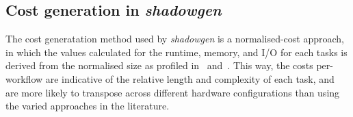 \documentclass{article}
\begin{document}
\begin{multicols}{2}
\subsection*{Cost generation in \textit{shadowgen}} 
The cost generatation method used by \textit{shadowgen} is a normalised-cost approach, in which the values
calculated for the runtime, memory, and I/O for each tasks is derived from 
the normalised size as profiled in~\cite{juve2013} and~\cite{bharathi2008}.
This way, the costs per-workflow are indicative of the relative length and
complexity of each task, and are more likely to transpose across different
hardware configurations than using the varied approaches in the literature. 
\end{multicols}
\end{document}
